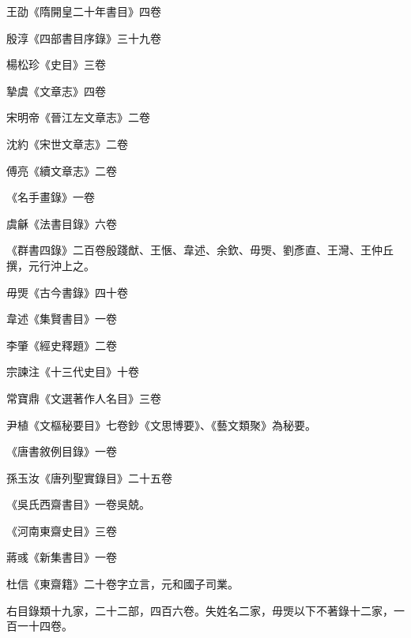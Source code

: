 \begin{pinyinscope}
 王劭《隋開皇二十年書目》四卷



 殷淳《四部書目序錄》三十九卷



 楊松珍《史目》三卷



 摯虞《文章志》四卷



 宋明帝《晉江左文章志》二卷



 沈約《宋世文章志》二卷



 傅亮《續文章志》二卷



 《名手畫錄》一卷



 虞龢《法書目錄》六卷



 《群書四錄》二百卷殷踐猷、王愜、韋述、余欽、毋煚、劉彥直、王灣、王仲丘撰，元行沖上之。



 毋煚《古今書錄》四十卷



 韋述《集賢書目》一卷



 李肇《經史釋題》二卷



 宗諫注《十三代史目》十卷



 常寶鼎《文選著作人名目》三卷



 尹植《文樞秘要目》七卷鈔《文思博要》、《藝文類聚》為秘要。



 《唐書敘例目錄》一卷



 孫玉汝《唐列聖實錄目》二十五卷



 《吳氏西齋書目》一卷吳兢。



 《河南東齋史目》三卷



 蔣彧《新集書目》一卷



 杜信《東齋籍》二十卷字立言，元和國子司業。



 右目錄類十九家，二十二部，四百六卷。失姓名二家，毋煚以下不著錄十二家，一百一十四卷。




\end{pinyinscope}

